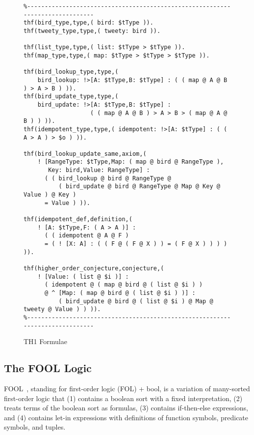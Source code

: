 \documentclass{easychair}
\begin{document}
\begin{figure}[htbp]
\begin{small}
\begin{verbatim}
%------------------------------------------------------------------------------
thf(bird_type,type,( bird: $tType )).
thf(tweety_type,type,( tweety: bird )).

thf(list_type,type,( list: $tType > $tType )).
thf(map_type,type,( map: $tType > $tType > $tType )).

thf(bird_lookup_type,type,(
    bird_lookup: !>[A: $tType,B: $tType] : ( ( map @ A @ B ) > A > B ) )).
thf(bird_update_type,type,(
    bird_update: !>[A: $tType,B: $tType] :
                   ( ( map @ A @ B ) > A > B > ( map @ A @ B ) ) )).
thf(idempotent_type,type,( idempotent: !>[A: $tType] : ( ( A > A ) > $o ) )).

thf(bird_lookup_update_same,axiom,(
    ! [RangeType: $tType,Map: ( map @ bird @ RangeType ),
       Key: bird,Value: RangeType] :
      ( ( bird_lookup @ bird @ RangeType @
          ( bird_update @ bird @ RangeType @ Map @ Key @ Value ) @ Key )
      = Value ) )).

thf(idempotent_def,definition,(
    ! [A: $tType,F: ( A > A )] :
      ( ( idempotent @ A @ F )
      = ( ! [X: A] : ( ( F @ ( F @ X ) ) = ( F @ X ) ) ) ) )).

thf(higher_order_conjecture,conjecture,(
    ! [Value: ( list @ $i )] :
      ( idempotent @ ( map @ bird @ ( list @ $i ) )
      @ ^ [Map: ( map @ bird @ ( list @ $i ) )] :
          ( bird_update @ bird @ ( list @ $i ) @ Map @ tweety @ Value ) ) )).
%------------------------------------------------------------------------------
\end{verbatim}
\end{small}
\caption{TH1 Formulae}
\label{TH1Example}
\end{figure}

\subsection{The FOOL Logic}
\label{FOOL}
FOOL~\cite{KKV15}, standing for first-order logic (FOL) + bool, is a variation
of many-sorted first-order logic that (1) contains a boolean sort with a fixed
interpretation, (2) treats terms of the boolean sort as formulas, (3) contains
if-then-else expressions, and (4) contains let-in expressions with definitions
of function symbols, predicate symbols, and tuples.
\end{document}
